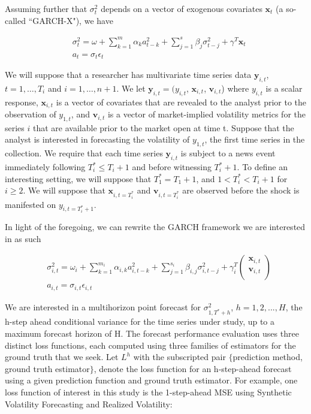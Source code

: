 \documentclass[11pt]{article}
\newcommand{\x}{\textbf{x}}
\newcommand{\y}{\textbf{y}}
\theoremstyle{definition}
\begin{document}
Assuming further that $\sigma^{2}_{t}$ depends on a vector of exogenous covariates $\x_{t}$ (a so-called ``GARCH-X"), we have

\begin{align*}
&\sigma_{t}^{2} = \omega+ \sum^{m}_{k=1}\alpha_{k}a^{2}_{t-k} + \sum_{j=1}^{s}\beta_{j}\sigma_{t-j}^{2} + \gamma^{T}\x_{t}\\
&a_{t} = \sigma_{t}\epsilon_{t}
\end{align*}


We will suppose that a researcher has multivariate time series data $\y_{i,t}$, $t = 1, \ldots,  T_i$ and $i = 1, \ldots, n+1$. We let $\y_{i,t} = (y_{i,t}$, $\x_{i,t}$, $\textbf{v}_{i,t}$) where $y_{i,t}$ is a scalar response,  $\x_{i,t}$ is a vector of covariates that are revealed to the analyst prior to the observation of $y_{1,t}$, and $\textbf{v}_{i,t}$ is a vector of market-implied volatility metrics for the series $i$ that are available prior to the market open at time t.  Suppose that the analyst is interested in forecasting the volatility of $y_{1,t}$, the first time series in the collection.  We require that each time series $\y_{i,t}$ is subject to a news event immediately following $T^*_i \leq T_i + 1$ and before witnessing $T^*_i+1$. To define an interesting setting, we will suppose that $T^*_1 = T_1 + 1$, and $1 < T^*_i < T_i + 1$ for $i \geq 2$. 
We will suppose that $\x_{i,t=T^*_i}$ and $\textbf{v}_{i,t=T^*_i}$ are observed before the shock is manifested on $y_{i,t=T^*_i+1}$.

In light of the foregoing, we can rewrite the GARCH framework we are interested in as such

\begin{align*}
&\sigma_{i,t}^{2} = \omega_{i} + \sum^{m_{i}}_{k=1}\alpha_{i,k}a^{2}_{i,t-k} + \sum_{j=1}^{s_{i}}\beta_{i,j}\sigma_{i,t-j}^{2} + \gamma_{i}^{T} \begin{pmatrix} \x_{i,t} \\ \textbf{v}_{i,t} \\ \end{pmatrix} \\
&a_{i,t} = \sigma_{i,t}\epsilon_{i,t}
\end{align*}


We are interested in a multihorizon point forecast for $\sigma^{2}_{1,T^{*}+h}$, $h=1,2,...,H$, the h-step ahead conditional variance for the time series under study, up to a maximum forecast horizon of H.  The forecast performance evaluation uses three distinct loss functions, each computed using three families of estimators for the ground truth that we seek.  Let $L^{h}$ with the subscripted pair $\{$prediction method, ground truth estimator$\}$, denote the loss function for an h-step-ahead forecast using a given prediction function and ground truth estimator.  For example, one loss function of interest in this study is the 1-step-ahead MSE using Synthetic Volatility Forecasting and Realized Volatility:
\end{document}
